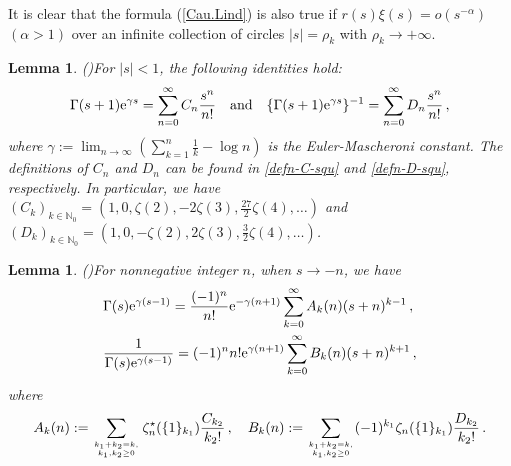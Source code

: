 \documentclass[11pt]{article}
\def\ze{\zeta}
\theoremstyle{plain}
\newtheorem{lem}[thm]{Lemma}
\theoremstyle{definition}
\begin{document}
It is clear that the formula (\ref{Cau.Lind}) is also true if $r(s)\xi(s)=o(s^{-\alpha})$ $(\alpha>1)$ over an infinite collection of circles $|s|=\rho_k$ with $\rho_k\to+\infty$.

\begin{lem}(\cite[Lemma 3.2]{WX2021})\label{Lem.CD}
For $|s|<1$, the following identities hold:
\[
\Gamma(s+1){\rm e}^{\gamma s}=\sum_{n=0}^\infty C_n\frac{s^n}{n!}\quad\text{and}\quad
\{\Gamma(s+1){\rm e}^{\gamma s}\}^{-1}=\sum_{n=0}^\infty D_n\frac{s^n}{n!}\,,
\]
where $\gamma:=\lim_{n\to\infty}\left(\sum_{k=1}^n \frac1{k}-\log n\right)$ is the \emph{Euler-Mascheroni constant}. The definitions of $C_n$ and $D_n$ can be found in \eqref{defn-C-squ} and \eqref{defn-D-squ}, respectively. In particular, we have $(C_k)_{k\in\mathbb{N}_0}=\left(1,0,\ze(2),-2\ze(3),\frac{27}{2}\ze(4),\ldots\right)$ and $(D_k)_{k\in\mathbb{N}_0}=\left(1,0,-\ze(2),2\ze(3),\frac{3}{2}\ze(4),\ldots\right)$.
\end{lem}

\begin{lem}(\cite[Lemma 3.3]{WX2021})\label{Lem.AB}
For nonnegative integer $n$, when $s\to-n$, we have
\begin{align*}
&\Gamma(s){\rm e}^{\gamma(s-1)}
    =\frac{(-1)^n}{n!}{\rm e}^{-\gamma(n+1)}\sum_{k=0}^\infty A_k(n)(s+n)^{k-1}\,,\\
&\frac{1}{\Gamma(s){\rm e}^{\gamma(s-1)}}
    =(-1)^nn!{\rm e}^{\gamma(n+1)}\sum_{k=0}^\infty B_k(n)(s+n)^{k+1}\,,
\end{align*}
where
\[
A_k(n):=\sum_{{k_1+k_2=k,\atop k_1,k_2\geq 0}}
    \zeta_n^\star(\{1\}_{k_1})\frac{C_{k_2}}{k_2!}\,,\quad
B_k(n):=\sum_{{k_1+k_2=k,\atop k_1,k_2\geq 0}}
    (-1)^{k_1}\zeta_n(\{1\}_{k_1})\frac{D_{k_2}}{k_2!}\,.
\]
\end{lem}
\end{document}
